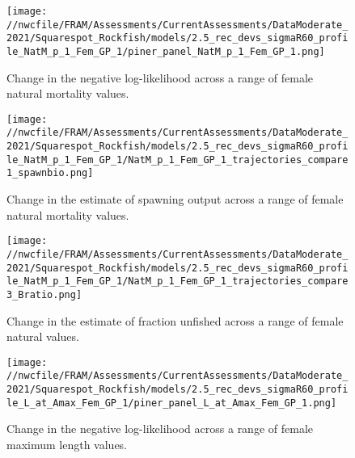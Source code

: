 \documentclass[11pt,
  english,
  a4paper,
]{article}
\begin{document}
\tagmcend\tagstructend


\begin{figure}
\centering
\texttt{[image: //nwcfile/FRAM/Assessments/CurrentAssessments/DataModerate\_2021/Squarespot\_Rockfish/models/2.5\_rec\_devs\_sigmaR60\_profile\_NatM\_p\_1\_Fem\_GP\_1/piner\_panel\_NatM\_p\_1\_Fem\_GP\_1.png]}
\caption{Change in the negative log-likelihood across a range of female natural mortality values.\label{fig:m-profile}}
\end{figure}

\tagmcend\tagstructend


\begin{figure}
\centering
\texttt{[image: //nwcfile/FRAM/Assessments/CurrentAssessments/DataModerate\_2021/Squarespot\_Rockfish/models/2.5\_rec\_devs\_sigmaR60\_profile\_NatM\_p\_1\_Fem\_GP\_1/NatM\_p\_1\_Fem\_GP\_1\_trajectories\_compare1\_spawnbio.png]}
\caption{Change in the estimate of spawning output across a range of female natural mortality values.\label{fig:m-ssb}}
\end{figure}

\tagmcend\tagstructend


\begin{figure}
\centering
\texttt{[image: //nwcfile/FRAM/Assessments/CurrentAssessments/DataModerate\_2021/Squarespot\_Rockfish/models/2.5\_rec\_devs\_sigmaR60\_profile\_NatM\_p\_1\_Fem\_GP\_1/NatM\_p\_1\_Fem\_GP\_1\_trajectories\_compare3\_Bratio.png]}
\caption{Change in the estimate of fraction unfished across a range of female natural values.\label{fig:m-depl}}
\end{figure}

\tagmcend\tagstructend


\begin{figure}
\centering
\texttt{[image: //nwcfile/FRAM/Assessments/CurrentAssessments/DataModerate\_2021/Squarespot\_Rockfish/models/2.5\_rec\_devs\_sigmaR60\_profile\_L\_at\_Amax\_Fem\_GP\_1/piner\_panel\_L\_at\_Amax\_Fem\_GP\_1.png]}
\caption{Change in the negative log-likelihood across a range of female maximum length values.\label{fig:linf-profile}}
\end{figure}
\end{document}
